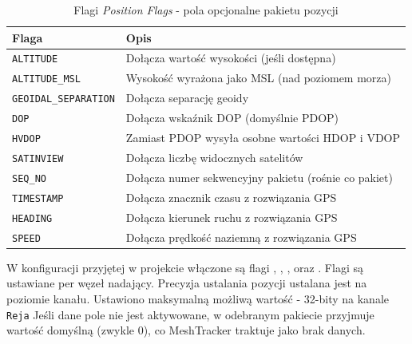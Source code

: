 \begin{table}[!h]
    \caption{Flagi \textit{Position Flags} - pola opcjonalne pakietu pozycji}
    \label{tab:position-flags}
    \centering
    \begin{tabular}{|l|p{9cm}|}
        \hline
        \textbf{Flaga} & \textbf{Opis} \\
        \hline
        \texttt{ALTITUDE}           & Dołącza wartość wysokości (jeśli dostępna) \\
        \texttt{ALTITUDE\_MSL}      & Wysokość wyrażona jako MSL (nad poziomem morza) \\
        \texttt{GEOIDAL\_SEPARATION}& Dołącza separację geoidy\footnotemark \\
        \texttt{DOP}                & Dołącza wskaźnik DOP (domyślnie PDOP)\footnotemark{} \\
        \texttt{HVDOP}              & Zamiast PDOP wysyła osobne wartości HDOP i VDOP\footnotemark \\
        \texttt{SATINVIEW}          & Dołącza liczbę widocznych satelitów \\
        \texttt{SEQ\_NO}            & Dołącza numer sekwencyjny pakietu (rośnie co pakiet) \\
        \texttt{TIMESTAMP}          & Dołącza znacznik czasu z rozwiązania GPS \\
        \texttt{HEADING}            & Dołącza kierunek ruchu z rozwiązania GPS \\
        \texttt{SPEED}              & Dołącza prędkość naziemną z rozwiązania GPS \\
        \hline
    \end{tabular}
\end{table}
\addtocounter{footnote}{-2}
\addtocounter{footnote}{1}
\addtocounter{footnote}{1}

W konfiguracji przyjętej w projekcie włączone są flagi \texttt{}, \texttt{},
\texttt{}, \texttt{} oraz \texttt{}. Flagi są ustawiane per węzeł nadający.
Precyzja ustalania pozycji ustalana jest na poziomie kanału. Ustawiono  maksymalną możliwą 
wartość - 32-bity na kanale \texttt{Reja} Jeśli dane pole nie jest aktywowane, w odebranym 
pakiecie przyjmuje wartość domyślną (zwykle 0), co MeshTracker traktuje jako brak danych. 


